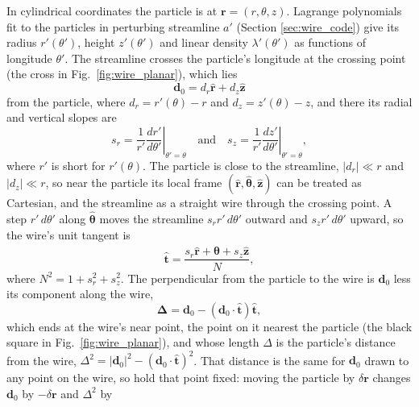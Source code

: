 \documentclass[twocolumn]{aastex702}
\begin{document}
In cylindrical coordinates the particle is at $\mathbf{r} = (r, \theta, z)$. Lagrange polynomials fit to the particles
in perturbing streamline $a'$ (Section \ref{sec:wire_code}) give its radius $r'(\theta')$, height $z'(\theta')$ and
linear density $\lambda'(\theta')$ as functions of longitude $\theta'$. The streamline crosses the particle's longitude
at the crossing point (the cross in Fig.~\ref{fig:wire_planar}), which lies
\begin{equation}
    \label{eqn:wire_d0}
    \mathbf{d}_0 = d_r\hat{\mathbf{r}} + d_z\hat{\mathbf{z}}
\end{equation}
from the particle, where $d_r = r'(\theta) - r$ and $d_z = z'(\theta) - z$, and there its radial and vertical slopes are
\begin{equation}
    \label{eqn:wire_slopes}
    s_r = \left.\frac{1}{r'}\frac{dr'}{d\theta'}\right|_{\theta' = \theta} \quad \mbox{and} \quad
    s_z = \left.\frac{1}{r'}\frac{dz'}{d\theta'}\right|_{\theta' = \theta},
\end{equation}
where $r'$ is short for $r'(\theta)$. The particle is close to the streamline, $|d_r| \ll r$ and $|d_z| \ll r$, so
near the particle its local frame $(\hat{\mathbf{r}}, \hat{\boldsymbol{\theta}}, \hat{\mathbf{z}})$ can be treated as
Cartesian, and the streamline as a straight wire through the crossing point. A step $r'\,d\theta'$ along
$\hat{\boldsymbol{\theta}}$ moves the streamline $s_rr'\,d\theta'$ outward and $s_zr'\,d\theta'$ upward, so the wire's
unit tangent is
\begin{equation}
    \label{eqn:wire_t}
    \hat{\mathbf{t}} = \frac{s_r\hat{\mathbf{r}} + \hat{\boldsymbol{\theta}} + s_z\hat{\mathbf{z}}}{N},
\end{equation}
where $N^2 = 1 + s_r^2 + s_z^2$. The perpendicular from the particle to the wire is $\mathbf{d}_0$ less its
component along the wire,
\begin{equation}
    \label{eqn:wire_D}
    \boldsymbol{\Delta} = \mathbf{d}_0 - (\mathbf{d}_0\cdot\hat{\mathbf{t}})\hat{\mathbf{t}},
\end{equation}
which ends at the wire's near point, the point on it nearest the particle (the black square in
Fig.~\ref{fig:wire_planar}), and whose length $\Delta$ is the particle's distance from the wire,
$\Delta^2 = |\mathbf{d}_0|^2 - (\mathbf{d}_0\cdot\hat{\mathbf{t}})^2$. That distance is the same for
$\mathbf{d}_0$ drawn to any point on the wire, so hold that point fixed: moving the particle by
$\delta\mathbf{r}$ changes $\mathbf{d}_0$ by $-\delta\mathbf{r}$ and $\Delta^2$ by
\end{document}
